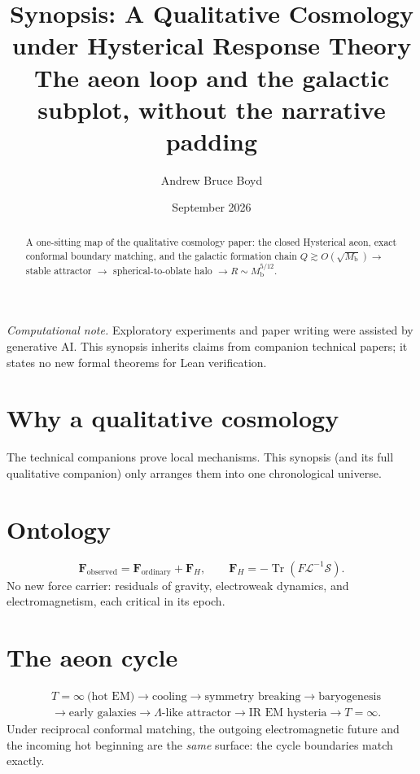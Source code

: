 \documentclass[11pt]{article}
\title{\textbf{Synopsis: A Qualitative Cosmology under Hysterical Response Theory}\\[0.35em]
\large The aeon loop and the galactic subplot, without the narrative padding}
\author{Andrew Bruce Boyd}
\date{September 2026}
\newcommand{\Mb}{M_{\mathrm{b}}}
\begin{document}
\maketitle
\noindent\textit{Computational note.}
Exploratory experiments and paper writing were assisted by generative AI.
This synopsis inherits claims from companion technical papers; it states no new
formal theorems for Lean verification.

\begin{abstract}
A one-sitting map of the qualitative cosmology paper: the closed Hysterical aeon,
exact conformal boundary matching, and the galactic formation chain
$Q\gtrsim O(\sqrt{\Mb})\to$ stable attractor $\to$ spherical-to-oblate halo
$\to R\sim\Mb^{5/12}$.
\end{abstract}

\section{Why a qualitative cosmology}
The technical companions prove local mechanisms.
This synopsis (and its full qualitative companion) only arranges them into one
chronological universe.

\section{Ontology}
\[
\mathbf F_{\mathrm{observed}}=\mathbf F_{\mathrm{ordinary}}+\mathbf F_H,
\qquad
\mathbf F_H=-\operatorname{Tr}(F\mathcal L^{-1}\mathcal S).
\]
No new force carrier: residuals of gravity, electroweak dynamics, and
electromagnetism, each critical in its epoch.

\section{The aeon cycle}
\[
\begin{aligned}
&T=\infty\ \text{(hot EM)}
\to\text{cooling}
\to\text{symmetry breaking}
\to\text{baryogenesis}\\
&\to\text{early galaxies}
\to\Lambda\text{-like attractor}
\to\text{IR EM hysteria}
\to T=\infty.
\end{aligned}
\]
Under reciprocal conformal matching, the outgoing electromagnetic future and the
incoming hot beginning are the \emph{same} surface: the cycle boundaries match
exactly.
\end{document}
